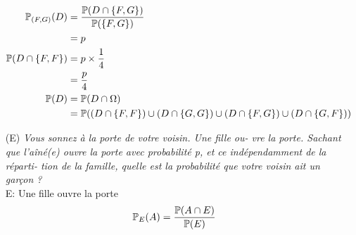 \begin{itemize}
    \begin{align*}
        \mathbb{P}_{(F,G)}(D) &= \frac{\mathbb{P}(D \cap \{F,G\})}{\mathbb{P}(\{F,G\})} \\
        &= p\\
        \mathbb{P}(D \cap \{F,F\}) &= p \times \frac{1}{4}\\
        &= \frac{p}{4} \\
        \mathbb{P}(D) &= \mathbb{P}(D \cap \Omega)\\
        &= \mathbb{P}((D \cap \{F,F\}) \cup (D \cap \{G,G\}) \cup (D \cap \{F,G\}) \cup (D \cap\{G,F\}))
    \end{align*}
    \item[(E)]  \textit{Vous sonnez à la porte de votre voisin. Une fille ou- vre la porte. Sachant que l’aîné(e) ouvre la porte avec probabilité p, et ce indépendamment de la réparti- tion de la famille, quelle est la probabilité que votre voisin ait un garçon ?}\\
    E: Une fille ouvre la porte
    \begin{align*}
        \mathbb{P}_E(A) = \frac{\mathbb{P}(A \cap E)}{\mathbb{P}(E)}
    \end{align*}
    \end{itemize}